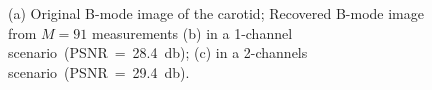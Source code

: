 \documentclass[journal]{IEEEtran}
\theoremstyle{definition}
\begin{document}
\begin{figure}[htb]
	\centering
	\hfill%
	\hfill%
	\hfill%
	\hfill%
	\caption{(a) Original B-mode image of the carotid; Recovered B-mode image from $M=91$ measurements (b) in a \num{1}-channel scenario~(PSNR~=~\SI{28.4}{\decibel}); (c) in a \num{2}-channels scenario~(PSNR~=~\SI{29.4}{\decibel}).}
	\label{fig_carotid}
\end{figure}
\end{document}
